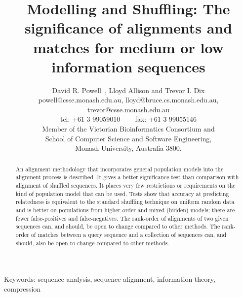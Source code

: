 \documentclass[a4paper,11pt,oneside]{article}
\begin{document}
\title{Modelling and Shuffling: The significance of alignments and matches for
medium or low information sequences}

\author{
  David R. Powell\footnotemark[1]~, Lloyd Allison and Trevor I. Dix \\
{\small powell@csse.monash.edu.au, lloyd@bruce.cs.monash.edu.au, trevor@csse.monash.edu.au} \\
{\small tel: +61 3 99059010 ~~~ fax: +61 3 99055146} \\
  Member of the Victorian Bioinformatics Consortium and \\
  School of Computer Science and Software Engineering, \\
  Monash University, Australia 3800.}

\renewcommand{\thefootnote}{\fnsymbol{footnote}}
\renewcommand{\thefootnote}{\arabic{footnote}}

\date{}
\maketitle



\begin{abstract}
An alignment methodology that incorporates general
population models into the alignment process is described.
It gives a better significance test than comparison with alignment of shuffled
sequences.
It places very few restrictions or requirements on the kind of
population model that can be used.
Tests show that accuracy at predicting relatedness is equivalent to
the standard shuffling technique on uniform random data and
is better on populations from higher-order and mixed (hidden) models;
there are fewer false-positives and false-negatives.
The rank-order of alignments of two given sequences can,
and should, be open to change compared to other methods.
The rank-order of matches between a query sequence and a collection of
sequences can, and should, also be open to change compared to other methods. 
\end{abstract}

{\small Keywords: sequence analysis, sequence alignment, information theory, compression}

\end{document}
